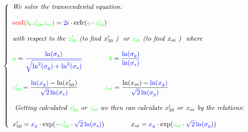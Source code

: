 \documentclass[12pt,reqno,intlimits,twoside]{amsart}
\DeclareMathOperator{\erfc}{erfc}%
\DeclareMathOperator{\eceI}{eceI}%
\begin{document}
\begin{equation}\label{EqXred50Xoi}  %
   \left\{
   \begin{array}{l}
      \text{\emph{We solve the transcendental equation:}}\\
      \phantom{\strut}\\
      \textcolor{red}{\eceI(}\textcolor{green}{b}, \textcolor{green}{z'_{50}}, \textcolor{green}{z_{oi}}
      \textcolor{red}{)} = \textcolor{blue}{2}i\cdot\erfc(\textcolor{green}{a}\cdot \textcolor{green}{z'_{50}})\\
      \phantom{\strut}\\
      \text{\emph{with respect to the }} \textcolor{green}{z'_{50}}
      \text{\emph{ (to find }} x'_{50} \text{\emph{ ) }}
      \text{\emph{ or }}
      \textcolor{green}{z_{oi}}
      \text{\emph{ (to find }} x_{oi} \text{\emph{ ) }}
      \text{\emph{ where}}\\
      \phantom{\strut}\\
      \textcolor{green}{a} =
      \textcolor{blue}{\dfrac{\ln(\sigma_s)}{\sqrt{\ln^2(\sigma_g) + \ln^2(\sigma_s)}}}\qquad\qquad
      \textcolor{green}{b} =
      \textcolor{blue}{\dfrac{\ln(\sigma_g)}{\ln(\sigma_s)}}\\
      \phantom{\strut}\\
      \textcolor{green}{z'_{50}} =
      \dfrac{\textcolor{blue}{\ln(x_g)} - \ln(x'_{50})}{\textcolor{blue}{\sqrt{2}\ln(\sigma_s)}}\qquad\qquad
      \textcolor{green}{z_{oi}} =
      \dfrac{\ln(x_{oi}) - \textcolor{blue}{\ln(x_g)}}{\textcolor{blue}{\sqrt{2}\ln(\sigma_g)}}\\
      \phantom{\strut}\\
      \text{\emph{ Getting calculated }} \textcolor{green}{z'_{50}}
      \text{\emph{ or }} \textcolor{green}{z_{oi}}
      \text{\emph{ we then can calculate }} x'_{50}
      \text{\emph{ or  }} x_{oi}
      \text{\emph{ by the relations: }}\\
      \phantom{\strut}\\
      x'_{50} = \textcolor{blue}{x_g}\cdot\exp(-\textcolor{green}{z'_{50}} \cdot \textcolor{blue}{\sqrt{2}\ln(\sigma_s)})
      \qquad\qquad
      x_{oi} = \textcolor{blue}{x_g}\cdot\exp(\textcolor{green}{z_{oi}} \cdot \textcolor{blue}{\sqrt{2}\ln(\sigma_g)})
      \end{array}
   \right.
\end{equation}
\end{document}
